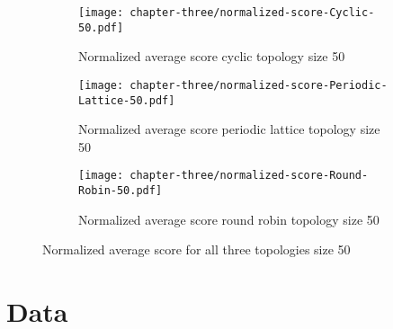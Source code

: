 \begin{figure}[H]
	\centering
	\begin{subfigure}[t]{0.65\textwidth}
		\centering
		\texttt{[image: chapter-three/normalized-score-Cyclic-50.pdf]}
		\caption{Normalized average score cyclic topology size 50}
	\end{subfigure}
	\hfill
	\begin{subfigure}[t]{0.65\textwidth}\centering
		\centering
		\texttt{[image: chapter-three/normalized-score-Periodic-Lattice-50.pdf]}
		\caption{Normalized average score periodic lattice topology size 50}
	\end{subfigure}
	\hfill
	\begin{subfigure}[t]{0.65\textwidth}\centering
		\centering
		\texttt{[image: chapter-three/normalized-score-Round-Robin-50.pdf]}
		\caption{Normalized average score round robin topology size 50}
	\end{subfigure}
	\caption{Normalized average score for all three topologies size 50}
	\label{fig:average-score-fifty}
\end{figure}

\chapter{Data}
